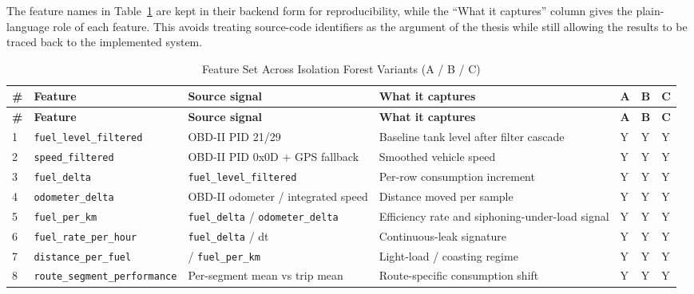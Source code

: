 The feature names in Table~\ref{tab:if_feature_set_variants} are kept in their backend form for reproducibility, while the ``What it captures'' column gives the plain-language role of each feature. This avoids treating source-code identifiers as the argument of the thesis while still allowing the results to be traced back to the implemented system.

\begingroup
\begin{center}
\tiny
\setlength{\tabcolsep}{1.5pt}
\renewcommand{\arraystretch}{1.12}
\begin{longtable}{|p{}|>{\raggedright\arraybackslash}p{}|>{\raggedright\arraybackslash}p{}|>{\raggedright\arraybackslash}p{}|p{}|p{}|p{}|}
\caption{Feature Set Across Isolation Forest Variants (A / B / C)}
\label{tab:if_feature_set_variants} \\
\hline
\textbf{\#} & \textbf{Feature} & \textbf{Source signal} & \textbf{What it captures} & \textbf{A} & \textbf{B} & \textbf{C} \\
\hline
\endfirsthead
\hline
\textbf{\#} & \textbf{Feature} & \textbf{Source signal} & \textbf{What it captures} & \textbf{A} & \textbf{B} & \textbf{C} \\
\hline
\endhead
1 & \texttt{fuel\_level\_filtered} & OBD-II PID 21/29 & Baseline tank level after filter cascade & Y & Y & Y \\
\hline
2 & \texttt{speed\_filtered} & OBD-II PID 0x0D + GPS fallback & Smoothed vehicle speed & Y & Y & Y \\
\hline
3 & \texttt{fuel\_delta} & \texttt{fuel\_level\_filtered} & Per-row consumption increment & Y & Y & Y \\
\hline
4 & \texttt{odometer\_delta} & OBD-II odometer / integrated speed & Distance moved per sample & Y & Y & Y \\
\hline
5 & \texttt{fuel\_per\_km} & \texttt{fuel\_delta} / \texttt{odometer\_delta} & Efficiency rate and siphoning-under-load signal & Y & Y & Y \\
\hline
6 & \texttt{fuel\_rate\_per\_hour} & \texttt{fuel\_delta} / dt & Continuous-leak signature & Y & Y & Y \\
\hline
7 & \texttt{distance\_per\_fuel} & 1 / \texttt{fuel\_per\_km} & Light-load / coasting regime & Y & Y & Y \\
\hline
8 & \texttt{route\_segment\_performance} & Per-segment mean vs trip mean & Route-specific consumption shift & Y & Y & Y \\

\end{longtable}
\end{center}
